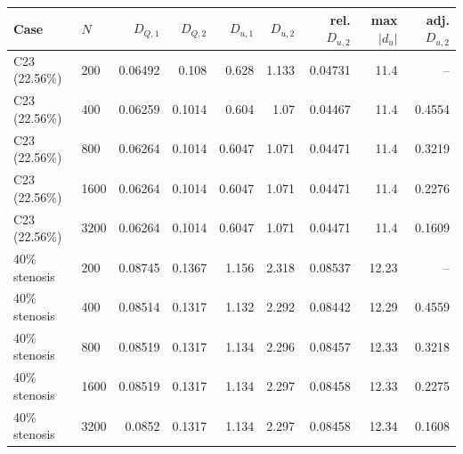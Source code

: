 \begin{tabular}{llrrrrrrr}
\toprule
Case & $N$ & $D_{Q,1}$ & $D_{Q,2}$ & $D_{u,1}$ & $D_{u,2}$ & rel. $D_{u,2}$ & max $|d_u|$ & adj. $D_{u,2}$ \\
\midrule
C23 (22.56\%) & 200 & 0.06492 & 0.108 & 0.628 & 1.133 & 0.04731 & 11.4 & -- \\
C23 (22.56\%) & 400 & 0.06259 & 0.1014 & 0.604 & 1.07 & 0.04467 & 11.4 & 0.4554 \\
C23 (22.56\%) & 800 & 0.06264 & 0.1014 & 0.6047 & 1.071 & 0.04471 & 11.4 & 0.3219 \\
C23 (22.56\%) & 1600 & 0.06264 & 0.1014 & 0.6047 & 1.071 & 0.04471 & 11.4 & 0.2276 \\
C23 (22.56\%) & 3200 & 0.06264 & 0.1014 & 0.6047 & 1.071 & 0.04471 & 11.4 & 0.1609 \\
40\% stenosis & 200 & 0.08745 & 0.1367 & 1.156 & 2.318 & 0.08537 & 12.23 & -- \\
40\% stenosis & 400 & 0.08514 & 0.1317 & 1.132 & 2.292 & 0.08442 & 12.29 & 0.4559 \\
40\% stenosis & 800 & 0.08519 & 0.1317 & 1.134 & 2.296 & 0.08457 & 12.33 & 0.3218 \\
40\% stenosis & 1600 & 0.08519 & 0.1317 & 1.134 & 2.297 & 0.08458 & 12.33 & 0.2275 \\
40\% stenosis & 3200 & 0.0852 & 0.1317 & 1.134 & 2.297 & 0.08458 & 12.34 & 0.1608 \\
\bottomrule
\end{tabular}
